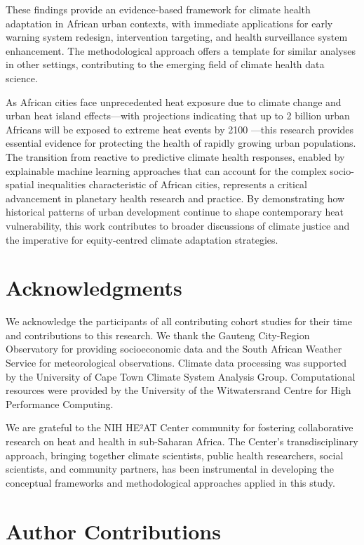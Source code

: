 \documentclass[11pt,a4paper]{article}
\begin{document}
These findings provide an evidence-based framework for climate health adaptation in African urban contexts, with immediate applications for early warning system redesign, intervention targeting, and health surveillance system enhancement. The methodological approach offers a template for similar analyses in other settings, contributing to the emerging field of climate health data science.

As African cities face unprecedented heat exposure due to climate change and urban heat island effects—with projections indicating that up to 2 billion urban Africans will be exposed to extreme heat events by 2100 \cite{fotsonguemo2023projected}—this research provides essential evidence for protecting the health of rapidly growing urban populations. The transition from reactive to predictive climate health responses, enabled by explainable machine learning approaches that can account for the complex socio-spatial inequalities characteristic of African cities, represents a critical advancement in planetary health research and practice. By demonstrating how historical patterns of urban development continue to shape contemporary heat vulnerability, this work contributes to broader discussions of climate justice and the imperative for equity-centred climate adaptation strategies.

\section*{Acknowledgments}

We acknowledge the participants of all contributing cohort studies for their time and contributions to this research. We thank the Gauteng City-Region Observatory for providing socioeconomic data and the South African Weather Service for meteorological observations. Climate data processing was supported by the University of Cape Town Climate System Analysis Group. Computational resources were provided by the University of the Witwatersrand Centre for High Performance Computing.

We are grateful to the NIH HE²AT Center community for fostering collaborative research on heat and health in sub-Saharan Africa. The Center's transdisciplinary approach, bringing together climate scientists, public health researchers, social scientists, and community partners, has been instrumental in developing the conceptual frameworks and methodological approaches applied in this study.

\section*{Author Contributions}
\end{document}
